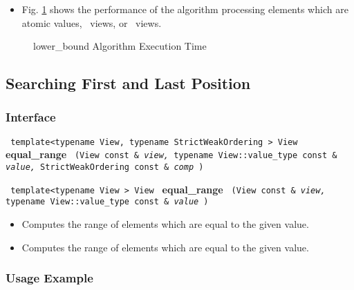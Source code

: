 \begin{itemize}
\item
Fig. \ref{fig:lobnd-alg-exec-exper}
shows the performance of the algorithm processing
elements which are atomic values, \stl\ views, or \stapl\ views.
\end{itemize}

\begin{figure}[p]
\caption{lower\_bound Algorithm Execution Time}
\label{fig:lobnd-alg-exec-exper}
\end{figure}

 
\subsection{Searching First and Last Position} \label{sec-sort-range}

\subsubsection{Interface} %

\noindent
\texttt{%
template<typename View, typename StrictWeakOrdering >
\newline
View 
}
\newline
\textbf{equal\_range}%
\texttt{%
(View const \&
\textit{view,}%
typename View::value\_type const \&
\textit{value,}%
StrictWeakOrdering const \&
\textit{comp}%
)
}
\vspace{0.4cm}

\noindent
\texttt{%
template<typename View >
\newline
View 
}
\newline
\textbf{equal\_range}%
\texttt{%
(View const \&
\textit{view,}%
typename View::value\_type const \&
\textit{value}%
)
}

\begin{itemize}
\item
Computes the range of elements which are equal to the given value. 
\item
Computes the range of elements which are equal to the given value. 
\end{itemize}

\subsubsection{Usage Example} %


